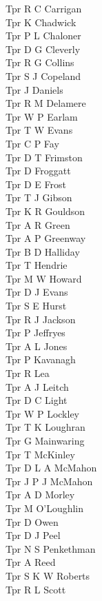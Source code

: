 \begin{multicols}{4}
  Tpr R C Carrigan \\
  Tpr K Chadwick \\
  Tpr P L Chaloner \\
  Tpr D G Cleverly \\
  Tpr R G Collins \\
  Tpr S J Copeland \\
  Tpr J Daniels \\
  Tpr R M Delamere \\
  Tpr W P Earlam \\
  Tpr T W Evans \\
  Tpr C P Fay \\
  Tpr D T Frimston \\
  Tpr D Froggatt \\
  Tpr D E Frost \\
  Tpr T J Gibson \\
  Tpr K R Gouldson \\
  Tpr A R Green \\
  Tpr A P Greenway \\
  Tpr B D Halliday \\
  Tpr T Hendrie \\
  Tpr M W Howard \\
  Tpr D J Evans \\
  Tpr S E Hurst \\
  Tpr R J  Jackson \\
  Tpr P Jeffryes \\
  Tpr A L  Jones \\
  Tpr P Kavanagh \\
  Tpr R Lea \\
  Tpr A J Leitch \\
  Tpr D C Light \\
  Tpr W P Lockley \\
  Tpr T K Loughran \\
  Tpr G Mainwaring \\
  Tpr T McKinley \\
  Tpr D L A McMahon \\
  Tpr J P J McMahon \\
  Tpr A D Morley \\
  Tpr M O'Loughlin \\
  Tpr D Owen \\
  Tpr D J Peel \\
  Tpr N S Penkethman \\
  Tpr A Reed \\
  Tpr S K W Roberts \\
  Tpr R L Scott \\

\end{multicols}
